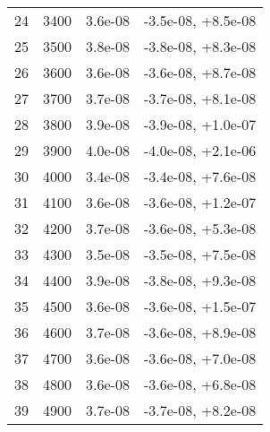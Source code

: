 \begin{table}
\begin{adjustbox}{width=1\textwidth/2}
\begin{tabular}{|c|c|c|c|}
\cline{1-4}
24 & 3400 & 3.6e-08 & -3.5e-08, +8.5e-08 \\
\cline{1-4}
25 & 3500 & 3.8e-08 & -3.8e-08, +8.3e-08 \\
\cline{1-4}
26 & 3600 & 3.6e-08 & -3.6e-08, +8.7e-08 \\
\cline{1-4}
27 & 3700 & 3.7e-08 & -3.7e-08, +8.1e-08 \\
\cline{1-4}
28 & 3800 & 3.9e-08 & -3.9e-08, +1.0e-07 \\
\cline{1-4}
29 & 3900 & 4.0e-08 & -4.0e-08, +2.1e-06 \\
\cline{1-4}
30 & 4000 & 3.4e-08 & -3.4e-08, +7.6e-08 \\
\cline{1-4}
31 & 4100 & 3.6e-08 & -3.6e-08, +1.2e-07 \\
\cline{1-4}
32 & 4200 & 3.7e-08 & -3.6e-08, +5.3e-08 \\
\cline{1-4}
33 & 4300 & 3.5e-08 & -3.5e-08, +7.5e-08 \\
\cline{1-4}
34 & 4400 & 3.9e-08 & -3.8e-08, +9.3e-08 \\
\cline{1-4}
35 & 4500 & 3.6e-08 & -3.6e-08, +1.5e-07 \\
\cline{1-4}
36 & 4600 & 3.7e-08 & -3.6e-08, +8.9e-08 \\
\cline{1-4}
37 & 4700 & 3.6e-08 & -3.6e-08, +7.0e-08 \\
\cline{1-4}
38 & 4800 & 3.6e-08 & -3.6e-08, +6.8e-08 \\
\cline{1-4}
39 & 4900 & 3.7e-08 & -3.7e-08, +8.2e-08 \\
\cline{1-4}
\end{tabular}
\end{adjustbox}
\end{table}

